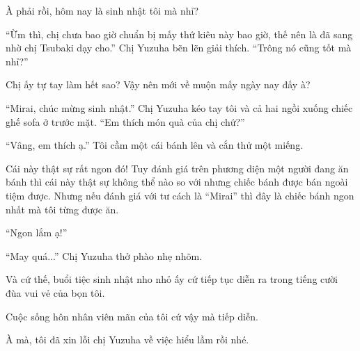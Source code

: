 {À phải rồi, hôm nay là sinh nhật tôi mà nhỉ?

``Ừm thì, chị chưa bao giờ chuẩn bị mấy thứ kiêu này bao giờ, thế nên là
đã sang nhờ chị Tsubaki dạy cho.'' Chị Yuzuha bẽn lẽn giải thích.
``Trông nó cũng tốt mà nhỉ?''

Chị ấy tự tay làm hết sao? Vậy nên mới về muộn mấy ngày nay đấy à?

``Mirai, chúc mừng sinh nhật.'' Chị Yuzuha kéo tay tôi và cả hai ngồi
xuống chiếc ghế sofa ở trước mặt. ``Em thích món quà của chị chứ?''

``Vâng, em thích ạ.'' Tôi cầm một cái bánh lên và cắn thử một miếng.

Cái này thật sự rất ngon đó! Tuy đánh giá trên phương diện một người
đang ăn bánh thì cái này thật sự không thể nào so với nhưng chiếc bánh
được bán ngoài tiệm được. Nhưng nếu đánh giá với tư cách là ``Mirai''
thì đây là chiếc bánh ngon nhất mà tôi từng được ăn.

``Ngon lắm ạ!''

``May quá...'' Chị Yuzuha thở phào nhẹ nhõm.

Và cứ thế, buổi tiệc sinh nhật nho nhỏ ấy cứ tiếp tục diễn ra trong
tiếng cười đùa vui vẻ của bọn tôi.

Cuộc sống hôn nhân viên mãn của tôi cứ vậy mà tiếp diễn.

À mà, tôi đã xin lỗi chị Yuzuha về việc hiểu lầm rồi nhé.
}